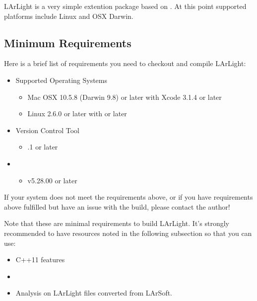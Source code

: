 LArLight is a very simple \CPP extention package based on \ROOT. 
At this point supported platforms include Linux and OSX Darwin. 

\subsection{Minimum Requirements}
Here is a brief list of requirements you need to checkout and compile LArLight:
\begin{itemize}
\item Supported Operating Systems
    \begin{itemize}
    \item Mac OSX 10.5.8 (Darwin 9.8) or later with Xcode 3.1.4 or later
    \item Linux 2.6.0 or later with  or later
    \end{itemize}
\item Version Control Tool
    \begin{itemize}
    \item {}.1 or later
    \end{itemize}
\item \ROOT
    \begin{itemize}
    \item v5.28.00 or later
    \end{itemize}
\end{itemize}

If your system does not meet the requirements above, or if you have requirements above fulfilled but have an issue with the build, please contact the author!

Note that these are minimal requirements to build LArLight. It's strongly recommended to have resources noted in the following subsection so that you can use:
\begin{itemize}
    \item {\ttfamily C++11} features
    \item \PyROOT
    \item Analysis on LArLight files converted from LArSoft.
\end{itemize}


